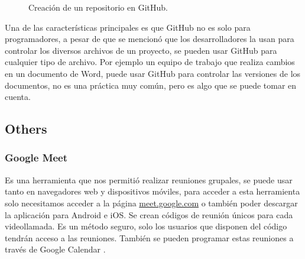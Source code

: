 \documentclass[conference]{IEEEtran}
\newcommand\tab[1][1cm]{\hspace*{#1}}
\begin{document}
    \begin{figure}[ht]
        \caption{Creación de un repositorio en GitHub.}
        \label{figiconqt}
    \end{figure}
    \newline
    \tab[0.55cm] Una de las características principales es que GitHub no es solo para programadores, a pesar de que se mencionó que los desarrolladores la usan para controlar los diversos archivos de un proyecto, se pueden usar GitHub para cualquier tipo de archivo. Por ejemplo un equipo de trabajo que realiza cambios en un documento de Word, puede usar GitHub para controlar las versiones de los documentos, no es una práctica muy común, pero es algo que se puede tomar en cuenta.
    
    \subsection{Others}
    
        \subsubsection{Google Meet}
        Es una herramienta que nos permitió realizar reuniones grupales, se puede usar tanto en navegadores web y dispositivos móviles, para acceder a esta herramienta solo necesitamos acceder a la página \textcolor{blue}{
        \href{meet.google.com}{meet.google.com}} o también poder descargar la aplicación para Android e iOS. Se crean códigos de reunión únicos para cada videollamada. Es un método seguro, solo los usuarios que disponen del código tendrán acceso a las reuniones. También se pueden programar estas reuniones a través de Google Calendar \citep{meet}.
        
\end{document}
